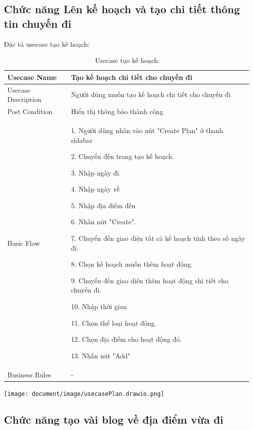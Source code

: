 \subsection{Chức năng Lên kế hoạch và tạo chi tiết thông tin chuyến đi}
 Đặc tả usecase tạo kế hoạch:  
 \begin{table}[H]
    \centering
	\begin{tabular}{|p{5cm}|p{10cm}|}
    \hline
    Usecase Name&Tạo kế hoạch chi tiết cho chuyến đi\\
    \hline
    Usecase Description&Người dùng muốn tạo kế hoạch chi tiết cho chuyến đi\\
    \hline
    Post Condition&Hiển thị thông báo thành công \\
    \hline
    Basic Flow& 1. Người dùng nhấn vào nút "Create Plan" ở thanh sidabar
    
    2. Chuyển đến trang tạo kế hoạch.
    
    3. Nhập ngày đi.
    
    4. Nhập ngày về
    
    5. Nhập địa điểm đến
    
    6. Nhấn nút "Create".
    
    7. Chuyển đến giao diện tất cả kế hoạch tính theo số ngày đi.
    
    8. Chọn kế hoạch muốn thêm hoạt động.
    
    9. Chuyển đến giao diện thêm hoạt động chi tiết cho chuyến đi.
    
    10. Nhập thời gian
    
    11. Chọn thể loại hoạt động.
    
    12. Chọn địa điểm cho hoạt động đó.
    
    13. Nhấn nút "Add"\\
    \hline Business Rules&- \\
   
   
	\hline
\end{tabular}
\caption{Usecase tạo kế hoạch }
\end{table}
 \begin{center}
  \captionsetup{type=figure}
  \texttt{[image: document/image/usecasePlan.drawio.png]}
\end{center}

\subsection{Chức năng tạo vài blog về địa điểm vừa đi}

